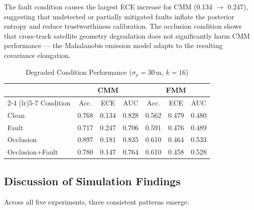 \documentclass[letterpaper,journal]{IEEEtran}
\begin{document}
The fault condition causes the largest ECE increase for CMM (0.134 $\to$ 0.247), suggesting that undetected or partially mitigated faults inflate the posterior entropy and reduce trustworthiness calibration. The occlusion condition shows that cross-track satellite geometry degradation does not significantly harm CMM performance --- the Mahalanobis emission model adapts to the resulting covariance elongation.

\begin{table}[htbp]
\centering
\caption{Degraded Condition Performance ($\sigma_{\rho}=30$\,m, $k=16$)}
\label{tab:degraded}
\footnotesize
\setlength{\tabcolsep}{4pt}
\begin{tabular}{@{}lcccccc@{}}
\toprule
& \multicolumn{3}{c}{CMM} & \multicolumn{3}{c}{FMM} \\
\cmidrule(lr){2-4} \cmidrule(lr){5-7}
Condition & Acc. & ECE & AUC & Acc. & ECE & AUC \\
\midrule
Clean           & 0.768 & 0.134 & 0.828 & 0.562 & 0.479 & 0.480 \\
Fault           & 0.717 & 0.247 & 0.706 & 0.591 & 0.476 & 0.489 \\
Occlusion       & 0.897 & 0.181 & 0.835 & 0.610 & 0.464 & 0.533 \\
Occlusion+Fault & 0.780 & 0.147 & 0.764 & 0.610 & 0.458 & 0.528 \\
\bottomrule
\end{tabular}
\end{table}

\subsection{Discussion of Simulation Findings}

Across all five experiments, three consistent patterns emerge:
\end{document}
